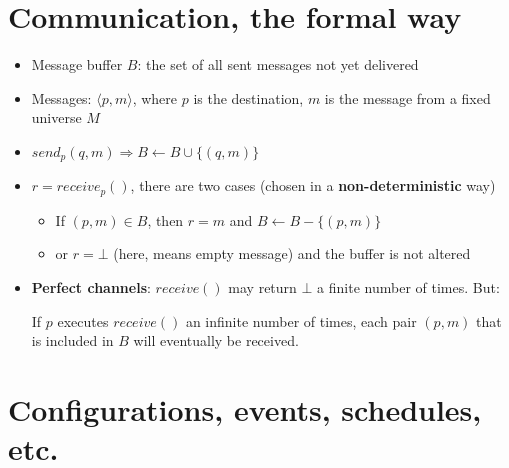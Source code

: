 \documentclass[12pt]{article}
\newcommand{\BI}{\begin{itemize}}
\newcommand{\EI}{\end{itemize}}
\newcommand{\receive}{\mathit{receive}}
\newcommand{\send}{\mathit{send}}
\begin{document}
\section*{Communication, the formal way}

\BI
\item Message buffer $B$: the set of all sent messages not yet delivered
\item Messages: $\langle p, m \rangle$, where $p$ is the destination, $m$
  is the message from a fixed universe $M$
\item $\send_p(q,m) \Rightarrow B \gets B \cup \{ (q,m) \}$
\item $r=\receive_p()$, there are two cases (chosen in a {\bf non-deterministic} way)
  \BI
    \item If $(p,m) \in B$, then $r=m$ and $B \gets B - \{ (p,m) \}$
    \item or $r = \bot$ (here, means empty message) and the buffer is not
      altered
  \EI
\item \textbf{Perfect channels}:
  $receive()$ may return $\bot$ a finite number of times. But:

  If $p$ executes $receive()$ an infinite number of times, each
  pair $(p,m)$ that is included in $B$ will eventually be received.
\EI

\section*{Configurations, events, schedules, etc.}
\end{document}
